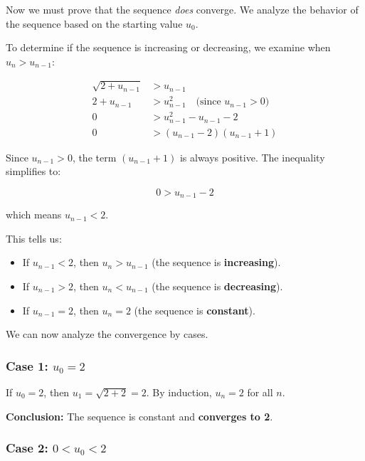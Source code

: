 \documentclass[12pt,a4paper]{article}
\theoremstyle{definition}
\begin{document}
Now we must prove that the sequence \textit{does} converge. We analyze the behavior of the sequence based on the starting value $u_0$.

To determine if the sequence is increasing or decreasing, we examine when $u_n > u_{n-1}$:

\begin{align*}
\sqrt{2 + u_{n-1}} &> u_{n-1}\\
2 + u_{n-1} &> u_{n-1}^2 \quad \text{(since } u_{n-1} > 0\text{)}\\
0 &> u_{n-1}^2 - u_{n-1} - 2\\
0 &> (u_{n-1} - 2)(u_{n-1} + 1)
\end{align*}

Since $u_{n-1} > 0$, the term $(u_{n-1} + 1)$ is always positive. The inequality simplifies to:

\[
0 > u_{n-1} - 2
\]

which means $u_{n-1} < 2$.

This tells us:
\begin{itemize}
    \item If $u_{n-1} < 2$, then $u_n > u_{n-1}$ (the sequence is \textbf{increasing}).
    \item If $u_{n-1} > 2$, then $u_n < u_{n-1}$ (the sequence is \textbf{decreasing}).
    \item If $u_{n-1} = 2$, then $u_n = 2$ (the sequence is \textbf{constant}).
\end{itemize}

We can now analyze the convergence by cases.

\subsubsection{Case 1: $u_0 = 2$}

If $u_0 = 2$, then $u_1 = \sqrt{2 + 2} = 2$. By induction, $u_n = 2$ for all $n$.

\textbf{Conclusion:} The sequence is constant and \textbf{converges to 2}.

\subsubsection{Case 2: $0 < u_0 < 2$}
\end{document}
